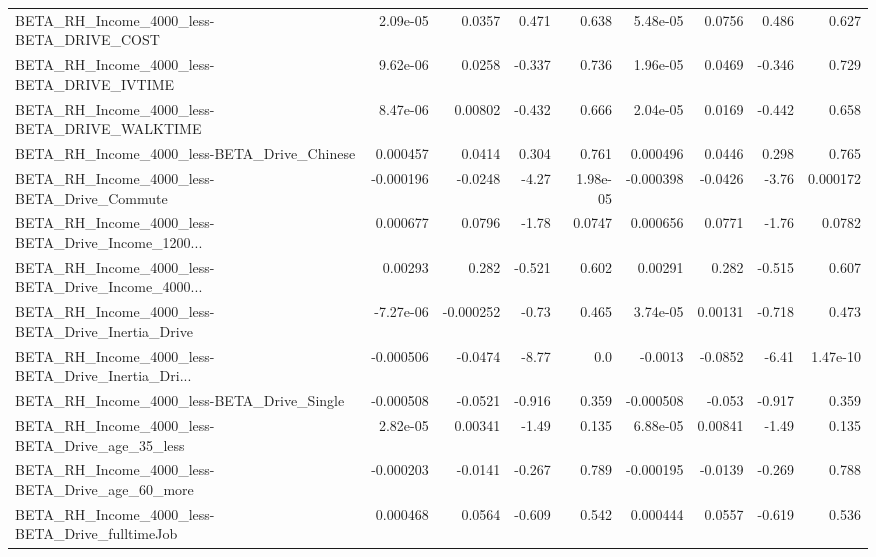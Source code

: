\begin{tabular}{lrrrrrrrr}
BETA\_RH\_Income\_4000\_less-BETA\_DRIVE\_COST           &    2.09e-05 &       0.0357 &    0.471 &    0.638 &   5.48e-05 &      0.0756 &        0.486 &         0.627 \\
BETA\_RH\_Income\_4000\_less-BETA\_DRIVE\_IVTIME         &    9.62e-06 &       0.0258 &   -0.337 &    0.736 &   1.96e-05 &      0.0469 &       -0.346 &         0.729 \\
BETA\_RH\_Income\_4000\_less-BETA\_DRIVE\_WALKTIME       &    8.47e-06 &      0.00802 &   -0.432 &    0.666 &   2.04e-05 &      0.0169 &       -0.442 &         0.658 \\
BETA\_RH\_Income\_4000\_less-BETA\_Drive\_Chinese        &    0.000457 &       0.0414 &    0.304 &    0.761 &   0.000496 &      0.0446 &        0.298 &         0.765 \\
BETA\_RH\_Income\_4000\_less-BETA\_Drive\_Commute        &   -0.000196 &      -0.0248 &    -4.27 & 1.98e-05 &  -0.000398 &     -0.0426 &        -3.76 &      0.000172 \\
BETA\_RH\_Income\_4000\_less-BETA\_Drive\_Income\_1200... &    0.000677 &       0.0796 &    -1.78 &   0.0747 &   0.000656 &      0.0771 &        -1.76 &        0.0782 \\
BETA\_RH\_Income\_4000\_less-BETA\_Drive\_Income\_4000... &     0.00293 &        0.282 &   -0.521 &    0.602 &    0.00291 &       0.282 &       -0.515 &         0.607 \\
BETA\_RH\_Income\_4000\_less-BETA\_Drive\_Inertia\_Drive  &   -7.27e-06 &    -0.000252 &    -0.73 &    0.465 &   3.74e-05 &     0.00131 &       -0.718 &         0.473 \\
BETA\_RH\_Income\_4000\_less-BETA\_Drive\_Inertia\_Dri... &   -0.000506 &      -0.0474 &    -8.77 &      0.0 &    -0.0013 &     -0.0852 &        -6.41 &      1.47e-10 \\
BETA\_RH\_Income\_4000\_less-BETA\_Drive\_Single         &   -0.000508 &      -0.0521 &   -0.916 &    0.359 &  -0.000508 &      -0.053 &       -0.917 &         0.359 \\
BETA\_RH\_Income\_4000\_less-BETA\_Drive\_age\_35\_less    &    2.82e-05 &      0.00341 &    -1.49 &    0.135 &   6.88e-05 &     0.00841 &        -1.49 &         0.135 \\
BETA\_RH\_Income\_4000\_less-BETA\_Drive\_age\_60\_more    &   -0.000203 &      -0.0141 &   -0.267 &    0.789 &  -0.000195 &     -0.0139 &       -0.269 &         0.788 \\
BETA\_RH\_Income\_4000\_less-BETA\_Drive\_fulltimeJob    &    0.000468 &       0.0564 &   -0.609 &    0.542 &   0.000444 &      0.0557 &       -0.619 &         0.536 \\

\end{tabular}
